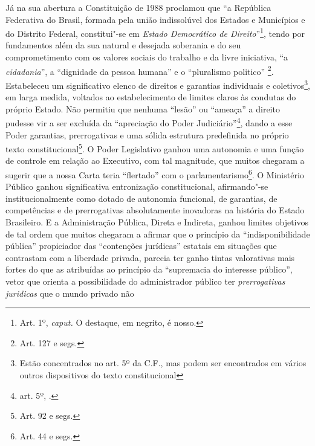 Já na sua abertura a Constituição de 1988 proclamou que ``a
República Federativa do Brasil, formada pela união indissolúvel dos
Estados e Municípios e do Distrito Federal, constitui"-se em
\emph{Estado Democrático de Direito}''\footnote{Art. 1º,
  \emph{caput.} O destaque, em negrito, é nosso.}, tendo por fundamentos
além da sua natural e desejada soberania e do seu comprometimento com os
valores sociais do trabalho e da livre iniciativa, ``a
\emph{cidadania}'', a ``dignidade da pessoa humana'' e o
``pluralismo politico'' \footnote{Art. 127 e segs.}. Estabeleceu
um significativo elenco de direitos e garantias individuais e
coletivos\footnote{Estão concentrados no art. 5º da C.F., mas podem ser
  encontrados em vários outros dispositivos do texto constitucional}, em
larga medida, voltados ao estabelecimento de limites claros às condutas
do próprio Estado. Não permitiu que nenhuma ``lesão'' ou
``ameaça'' a direito pudesse vir a ser excluída da
``apreciação do Poder Judiciário''\footnote{art. 5º, .},
dando a esse Poder garantias, prerrogativas e uma sólida estrutura
predefinida no próprio texto constitucional\footnote{Art. 92 e segs.}. O
Poder Legislativo ganhou uma autonomia e uma função de controle em
relação ao Executivo, com tal magnitude, que muitos chegaram a sugerir
que a nossa Carta teria ``flertado'' com o parlamentarismo\footnote{Art.
  44 e segs.}. O Ministério Público ganhou significativa entronização
constitucional, afirmando"-se institucionalmente como dotado de autonomia
funcional, de garantias, de competências e de prerrogativas
absolutamente inovadoras na história do Estado Brasileiro. E a
Administração Pública, Direta e Indireta, ganhou limites objetivos de
tal ordem que muitos chegaram a afirmar que o princípio da
``indisponibilidade pública'' propiciador das ``contenções
jurídicas'' estatais em situações que contrastam com a liberdade
privada, parecia ter ganho tintas valorativas mais fortes do que as
atribuídas ao princípio da ``supremacia do interesse público'',
vetor que orienta a possibilidade do administrador público ter
\emph{prerrogativas juridicas} que o mundo privado não
